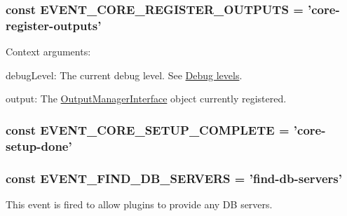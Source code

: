\hypertarget{group__events_gaac23553a1eec1074d5077678c6a02afc}{
\subsubsection[{E\-V\-E\-N\-T\-\_\-\-C\-O\-R\-E\-\_\-\-R\-E\-G\-I\-S\-T\-E\-R\-\_\-\-O\-U\-T\-P\-U\-T\-S}]{\setlength{\rightskip}{0pt plus 5cm}const E\-V\-E\-N\-T\-\_\-\-C\-O\-R\-E\-\_\-\-R\-E\-G\-I\-S\-T\-E\-R\-\_\-\-O\-U\-T\-P\-U\-T\-S = 'core-\/register-\/outputs'}}\label{group__events_gaac23553a1eec1074d5077678c6a02afc}
Context arguments\-:
\begin{DoxyItemize}
\item {\ttfamily debug\-Level\-:} The current debug level. See \hyperlink{group__debug__levels}{Debug levels}.
\item {\ttfamily output\-:} The \hyperlink{interfaceOutputManagerInterface}{Output\-Manager\-Interface} object currently registered. 
\end{DoxyItemize}\hypertarget{group__events_ga87085c0924b7cd74a4cd3902fcd51f48}{
\subsubsection[{E\-V\-E\-N\-T\-\_\-\-C\-O\-R\-E\-\_\-\-S\-E\-T\-U\-P\-\_\-\-C\-O\-M\-P\-L\-E\-T\-E}]{\setlength{\rightskip}{0pt plus 5cm}const E\-V\-E\-N\-T\-\_\-\-C\-O\-R\-E\-\_\-\-S\-E\-T\-U\-P\-\_\-\-C\-O\-M\-P\-L\-E\-T\-E = 'core-\/setup-\/done'}}\label{group__events_ga87085c0924b7cd74a4cd3902fcd51f48}
\hypertarget{group__events_gadbf9bda7e59b16c872f429349760b4dc}{
\subsubsection[{E\-V\-E\-N\-T\-\_\-\-F\-I\-N\-D\-\_\-\-D\-B\-\_\-\-S\-E\-R\-V\-E\-R\-S}]{\setlength{\rightskip}{0pt plus 5cm}const E\-V\-E\-N\-T\-\_\-\-F\-I\-N\-D\-\_\-\-D\-B\-\_\-\-S\-E\-R\-V\-E\-R\-S = 'find-\/db-\/servers'}}\label{group__events_gadbf9bda7e59b16c872f429349760b4dc}
This event is fired to allow plugins to provide any D\-B servers.

